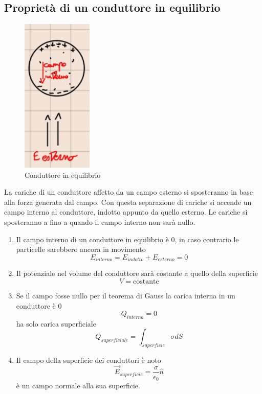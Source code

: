 \documentclass[a4paper, 12pt]{book}
\theoremstyle{plain}
\begin{document}
\subsection{Proprietà di un conduttore in equilibrio}
\begin{figure}
    \includegraphics[width=0.3\textwidth]{conduttore.png}
    \caption{Conduttore in equilibrio}
\end{figure}

La  cariche di un conduttore affetto da un campo esterno si 
sposteranno in base alla forza generata dal campo. Con questa separazione
di cariche si accende un campo interno al conduttore, indotto appunto da quello esterno.
Le cariche si sposteranno a fino a quando il campo interno non sarà nullo.

\begin{enumerate}
    \item Il campo interno di un conduttore in equilibrio è $0$, in caso contrario le particelle sarebbero ancora in movimento\[{E_{interno}} = {E_{indotto}} + {E_{esterno}} = 0\]
    \item Il potenziale nel volume del conduttore sarà costante a quello della superficie \[V = \textrm{costante}\]
    \item Se il campo fosse nullo per il teorema di Gauss la carica interna in un conduttore è $0$ \[Q_{interna} = 0\]ha solo carica superficiale \[Q_{superficiale} = \int_{superficie} \sigma dS\]
    \item Il campo della superficie dei conduttori è noto \[\vec{E}_{superficie} = \frac{\sigma}{\epsilon_0}\hat{n}\] è un campo normale alla sua superficie.
\end{enumerate}
\end{document}

